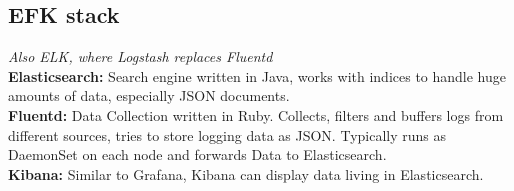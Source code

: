\subsection{EFK stack}
\textit{Also ELK, where Logstash replaces Fluentd} \\
\textbf{Elasticsearch:} Search engine written in Java, works with indices to handle huge amounts of data, especially JSON documents. \\
\textbf{Fluentd:} Data Collection written in Ruby. Collects, filters and buffers logs from different sources, tries to store logging data as JSON. Typically runs as DaemonSet on each node and forwards Data to Elasticsearch. \\
\textbf{Kibana:} Similar to Grafana, Kibana can display data living in Elasticsearch.
